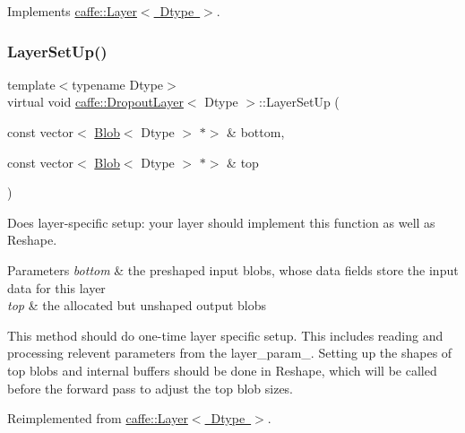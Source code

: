 Implements \mbox{\hyperlink{classcaffe_1_1_layer_a576ac6a60b1e99fe383831f52a6cea77}{caffe\+::\+Layer$<$ Dtype $>$}}.

\mbox{\label{classcaffe_1_1_dropout_layer_aaf3f194d0e4936f7a657b61d7468d744}} 
\subsubsection{\texorpdfstring{Layer\+Set\+Up()}{LayerSetUp()}\hspace{0.1cm}{\footnotesize\ttfamily [1/2]}}
{\footnotesize\ttfamily template$<$typename Dtype$>$ \\
virtual void \mbox{\hyperlink{classcaffe_1_1_dropout_layer}{caffe\+::\+Dropout\+Layer}}$<$ Dtype $>$\+::Layer\+Set\+Up (\begin{DoxyParamCaption}\item[{const vector$<$ \mbox{\hyperlink{classcaffe_1_1_blob}{Blob}}$<$ Dtype $>$ $\ast$$>$ \&}]{bottom,  }\item[{const vector$<$ \mbox{\hyperlink{classcaffe_1_1_blob}{Blob}}$<$ Dtype $>$ $\ast$$>$ \&}]{top }\end{DoxyParamCaption})\hspace{0.3cm}{\ttfamily [virtual]}}



Does layer-\/specific setup\+: your layer should implement this function as well as Reshape. 


\begin{DoxyParams}{Parameters}
{\em bottom} & the preshaped input blobs, whose data fields store the input data for this layer \\
\hline
{\em top} & the allocated but unshaped output blobs\\
\hline
\end{DoxyParams}
This method should do one-\/time layer specific setup. This includes reading and processing relevent parameters from the {\ttfamily layer\+\_\+param\+\_\+}. Setting up the shapes of top blobs and internal buffers should be done in {\ttfamily Reshape}, which will be called before the forward pass to adjust the top blob sizes. 

Reimplemented from \mbox{\hyperlink{classcaffe_1_1_layer_a481323a3e0972c682787f2137468c29f}{caffe\+::\+Layer$<$ Dtype $>$}}.

